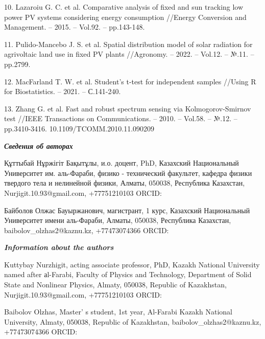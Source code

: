 \begin{references}
10. Lazaroiu G. C. et al. Comparative analysis of fixed and sun
tracking low power PV systems considering energy consumption //Energy
Conversion and Management. -- 2015. -- Vol.92. -- pp.143-148.

11. \href{https://doi.org/10.1016/j.enconman.2014.12.046\%20}{}
Pulido-Mancebo J. S. et al. Spatial distribution model of solar
radiation for agrivoltaic land use in fixed PV plants //Agronomy. --
2022. -- Vol.12. -- №.11. -- pp.2799.
\href{https://doi.org/10.3390/agronomy12112799}{}

12. MacFarland T. W. et al. Student's t-test for independent samples
//Using R for Biostatistics. -- 2021. -- С.141-240.
\href{https://doi.org/10.1007/978-3-030-62404-0_3}{}

13. Zhang G. et al. Fast and robust spectrum sensing via
Kolmogorov-Smirnov test //IEEE Transactions on Communications. --
2010. -- Vol.58. -- №.12. -- pp.3410-3416.
10.1109/TCOMM.2010.11.090209
\end{references}

\begin{authorinfo}
\emph{{\bfseries Сведения об авторах}}

Құттыбай Нұржігіт Бақытұлы, и.о. доцент, PhD, Казахский Национальный
Университет им. аль-Фараби, физико - технический факультет, кафедра физики
твердого тела и нелинейной физики, Алматы, 050038, Республика Казахстан,
Nurjigit.10.93@gmail.com,
+77751210103 ORCID:
\href{https://orcid.org/0000-0002-5723-6642}{}

Байболов Олжас Бауыржанович, магистрант, 1 курс, Казахский Национальный
Университет имени аль-Фараби, Алматы, 050038, Республика Казахстан,
baibolov\_olzhas2@kaznu.kz,
+77473074366 ORCID:
\href{https://orcid.org/0009-0006-7802-9577}{}

\emph{{\bfseries Information about the authors}}

Kuttybay Nurzhigit, acting associate professor, PhD, Kazakh National
University named after аl-Farabi, Faculty of Physics and Technology,
Department of Solid State and Nonlinear Physics, Almaty, 050038,
Republic of Kazakhstan,
Nurjigit.10.93@gmail.com,
+77751210103 ORCID:
\href{https://orcid.org/0000-0002-5723-6642}{}

Baibolov Olzhas, Master' s student, 1st year, Al-Farabi
Kazakh National University, Almaty, 050038, Republic of Kazakhstan,
baibolov\_olzhas2@kaznu.kz,
+77473074366 ORCID:
\href{https://orcid.org/0009-0006-7802-9577}{}\
\end{authorinfo}
